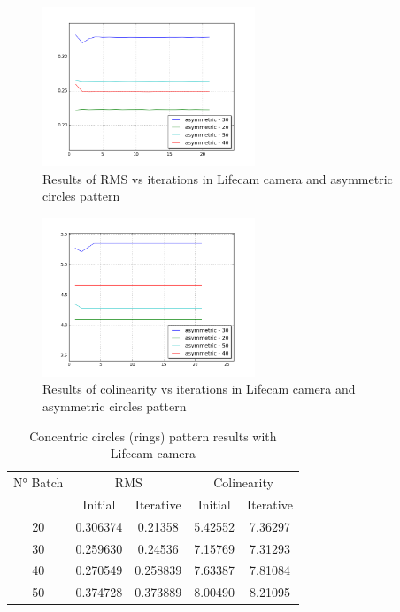 \documentclass[journal]{IEEEtran}
\begin{document}
\begin{figure}[H]
\centering
\includegraphics[width=2.5in]{_img/report_4/img_results_lifecam_asymmetric.png}
\caption{Results of RMS vs iterations in Lifecam camera and asymmetric circles pattern}
\end{figure}

\begin{figure}[H]
\centering
\includegraphics[width=2.5in]{_img/report_4/img_results_lifecam_colinearity_asymmetric.png}
\caption{Results of colinearity vs iterations in Lifecam camera and asymmetric circles pattern}
\end{figure}

\begin{table}[h]
\centering
\caption{Concentric circles (rings) pattern results with Lifecam camera}
\begin{tabular}{ |c||c|c|c|c|  }
 \hline
 N° Batch & \multicolumn{2}{c|}{RMS} & \multicolumn{2}{c|}{Colinearity}\\
 \cline{2-5}
 & Initial & Iterative & Initial & Iterative \\
 \hline
 20        & 0.306374 & 0.21358 & 5.42552 & 7.36297 \\
 30        & 0.259630 & 0.24536 & 7.15769 & 7.31293 \\
 40        & 0.270549 & 0.258839 & 7.63387 & 7.81084 \\
 50        & 0.374728 & 0.373889 & 8.00490 & 8.21095 \\
 \hline
\end{tabular}
\\
\end{table}
\end{document}
